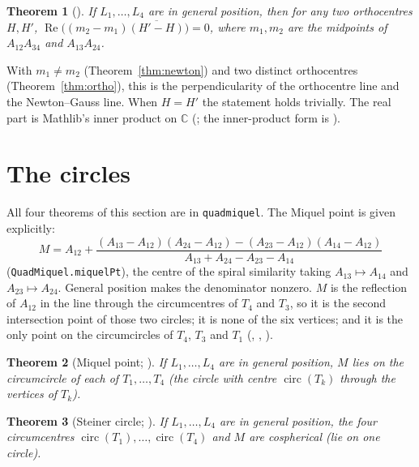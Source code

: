 \documentclass[11pt]{article}
\newtheorem{theorem}{Theorem}
\theoremstyle{definition}
\theoremstyle{remark}
\newcommand{\lean}[1]{\texttt{#1}}
\newcommand{\CC}{\mathbb{C}}
\begin{document}
\begin{theorem}[]\label{thm:perp}
If $L_1,\dots,L_4$ are in general position, then for any two orthocentres $H,H'$,
$\operatorname{Re}\big((m_2-m_1)\overline{(H'-H)}\big)=0$, where $m_1,m_2$ are the midpoints of
$A_{12}A_{34}$ and $A_{13}A_{24}$.
\end{theorem}
With $m_1\neq m_2$ (Theorem~\ref{thm:newton}) and two distinct orthocentres (Theorem~\ref{thm:ortho}),
this is the perpendicularity of the orthocentre line and the Newton--Gauss line. When $H=H'$ the
statement holds trivially. The real part is Mathlib's inner product on $\CC$
(; the inner-product form is ).

\section{The circles}\label{sec:circ}

All four theorems of this section are in \lean{quadmiquel}. The Miquel point is given explicitly:
\[
  M=A_{12}+\frac{(A_{13}-A_{12})(A_{24}-A_{12})-(A_{23}-A_{12})(A_{14}-A_{12})}{A_{13}+A_{24}-A_{23}-A_{14}}
\]
(\lean{QuadMiquel.miquelPt}), the centre of the spiral similarity taking $A_{13}\mapsto A_{14}$ and
$A_{23}\mapsto A_{24}$. General position makes the denominator nonzero. $M$ is the reflection of $A_{12}$ in the line
through the circumcentres of $T_4$ and $T_3$, so it is the second intersection point of those two
circles; it is none of the six vertices; and it is the only point on the circumcircles of $T_4$,
$T_3$ and $T_1$ (, ,
).

\begin{theorem}[Miquel point; ]\label{thm:miquel}
If $L_1,\dots,L_4$ are in general position, $M$ lies on the circumcircle of each of $T_1,\dots,T_4$
(the circle with centre $\operatorname{circ}(T_k)$ through the vertices of $T_k$).
\end{theorem}

\begin{theorem}[Steiner circle; ]\label{thm:steiner}
If $L_1,\dots,L_4$ are in general position, the four circumcentres $\operatorname{circ}(T_1),\dots,
\operatorname{circ}(T_4)$ and $M$ are cospherical (lie on one circle).
\end{theorem}
\end{document}
